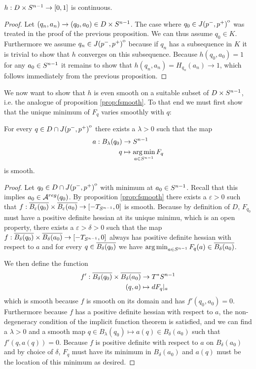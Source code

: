 \begin{corollary}
    $h:D\times {S^{n-1}}\to [0,1]$ is continuous.
\end{corollary}
\begin{proof}
    Let $(q_n,a_n)\to (q_0,a_0)\in D\times {S^{n-1}}$. The case where $q_0\in {\kern0ptJ(p^-,p^+)}^{\mathrm{o}}$ was treated in the proof of the previous proposition. We can thus assume $q_0\in K$. Furthermore we assume $q_n \in {\kern0ptJ(p^-,p^+)}^{\mathrm{o}}$ because if $q_n$ has a subsequence in $K$ it is trivial to show that $h$ converges on this subsequence. Because $h(q_0,a_0)=1$ for any $a_0\in {S^{n-1}}$ it remains to show that $h(q_n,a_n)=H_{q_n}(a_n)\to 1$, which follows immediately from the previous proposition.
\end{proof}

We now want to show that $h$ is even smooth on a suitable subset of $D\times {S^{n-1}}$, i.e. the analogue of proposition \ref{prop:fsmooth}. To that end we must first show that the unique minimum of $F_q$ varies smoothly with $q$:
\begin{lemma}\label{lem:minsmooth}
    For every $q\in D\cap {\kern0ptJ(p^-,p^+)}^{\mathrm{o}}$ there exists a $\lambda>0$ such that the map 
    \begin{align*}
        a:B_\lambda(q_0)&\to {S^{n-1}}\\
        q&\mapsto \operatorname*{arg\,min}_{a\in {S^{n-1}}} F_q
    \end{align*} is smooth.
\end{lemma}
\begin{proof}
    Let $q_0\in D\cap {\kern0ptJ(p^-,p^+)}^{\mathrm{o}}$ with minimum at $a_0\in {S^{n-1}}$. Recall that this implies $a_0\in {{\mathcal{A}}^{reg}}(q_0)$.
    By proposition \ref{prop:fsmooth} there exists a $\varepsilon>0$ such that $f:{\overline{B_\varepsilon(q_0)}}\times{\overline{B_\varepsilon(a_0)}}\to [-T_{S^{n-1}},0]$ is smooth. Because by definition of $D$, $F_{q_0}$ must have a positive definite hessian at its unique minimu, which is an open property, there exists a $\varepsilon>\delta>0$ such that the map $f:{\overline{B_\delta(q_0)}}\times{\overline{B_\delta(a_0)}}\to [-T_{S^{n-1}},0]$ always has positive definite hessian with respect to $a$ and for every $q\in {\overline{B_\delta(q_0)}}$ we have $\operatorname*{arg\,min}_{a\in {S^{n-1}}} F_{q}(a) \in {\overline{B_\delta(a_0)}}$. 

    We then define the function 
    \begin{align*}
        f':{\overline{B_\delta(q_0)}}\times{\overline{B_\delta(a_0)}}&\to T^*{S^{n-1}}\\
        (q,a)&\mapsto dF_q\rvert_a
    \end{align*} which is smooth because $f$ is smooth on its domain and has $f'(q_0,a_0)=0$. Furthermore because $f$ has a positive definite hessian with respect to $a$, the non-degeneracy condition of the implicit function theorem is satisfied, and we can find a $\lambda>0$ and a smooth map $q\in B_\lambda(q_0)\mapsto a(q)\in B_\delta(a_0)$ such that $f'(q,a(q))=0$. Because $f$ is positive definite with respect to $a$ on $B_\delta(a_0)$ and by choice of $\delta$, $F_q$ must have its minimum in $B_\delta(a_0)$ and $a(q)$ must be the location of this minimum as desired.
\end{proof}


